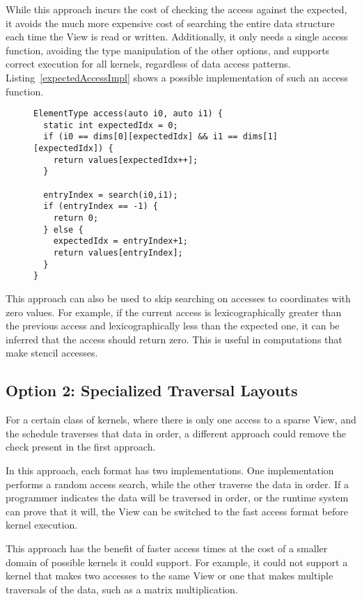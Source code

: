While this approach incurs the cost of checking the access against the expected, it avoids the much more expensive cost of searching the entire data structure each time the View is read or written.
Additionally, it only needs a single access function, avoiding the type manipulation of the other options, and supports correct execution for all kernels, regardless of data access patterns.
Listing~\ref{expectedAccessImpl} shows a possible implementation of such an access function.
\begin{figure}
\begin{lstlisting}[caption={Possible implementation fo the Expected Next Access approach to efficient data traversal.},label=expectedAccessImpl]
ElementType access(auto i0, auto i1) {
  static int expectedIdx = 0;
  if (i0 == dims[0][expectedIdx] && i1 == dims[1][expectedIdx]) {
    return values[expectedIdx++];
  }
  
  entryIndex = search(i0,i1);
  if (entryIndex == -1) {
    return 0;
  } else {
    expectedIdx = entryIndex+1;
    return values[entryIndex];
  }
}
\end{lstlisting}
\end{figure}

This approach can also be used to skip searching on accesses to coordinates with zero values.
For example, if the current access is lexicographically greater than the previous access and lexicographically less than the expected one, it can be inferred that the access should return zero. This is useful in computations that make stencil accesses.

\subsection{Option 2: Specialized Traversal Layouts}
For a certain class of kernels, where there is only one access to a sparse View, and the schedule traverses that data in order, a different approach could remove the check present in the first approach.

In this approach, each format has two implementations. 
One implementation performs a random access search, while the other traverse the data in order. 
If a programmer indicates the data will be traversed in order, or the runtime system can prove that it will, the View can be switched to the fast access format before kernel execution.

This approach has the benefit of faster access times at the cost of a smaller domain of possible kernels it could support. 
For example, it could not support a kernel that makes two accesses to the same View or one that makes multiple traversals of the data, such as a matrix multiplication.

